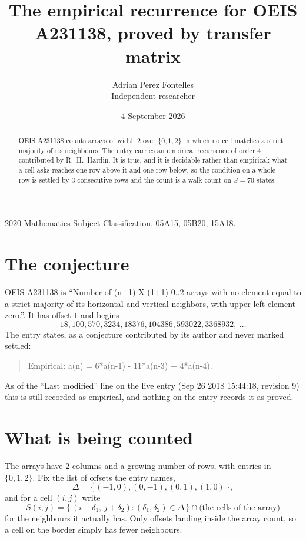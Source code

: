 \documentclass[11pt,a4paper]{article}
\title{The empirical recurrence for OEIS A231138, proved by transfer matrix}
\author{Adrian Perez Fontelles\\ \small Independent researcher}
\date{4 September 2026}
\theoremstyle{plain}
\theoremstyle{definition}
\begin{document}
\maketitle

\begin{abstract}
OEIS A231138 counts arrays of width $2$ over $\{0,1,2\}$ in which no cell matches a strict majority of its neighbours. The entry carries an
empirical recurrence of order $4$ contributed by R.~H.~Hardin. It is true, and it is
decidable rather than empirical: what a cell asks reaches one row above
it and one row below, so the condition on a whole row is settled by
$3$ consecutive rows and the count is a walk count on $S=70$ states.
\end{abstract}

\noindent\small 2020 Mathematics Subject Classification. 05A15, 05B20, 15A18.\normalsize

\section{The conjecture}

OEIS A231138 is ``Number of (n+1) X (1+1) 0..2 arrays with no element equal to a strict majority of its horizontal and vertical neighbors, with upper left element zero.''. It has offset $1$ and begins
\[
18, 100, 570, 3234, 18376, 104386, 593022, 3368932,\ \dots
\]
The entry states, as a conjecture contributed by its author and never marked settled:
\begin{quote}
Empirical: a(n) = 6*a(n-1) - 11*a(n-3) + 4*a(n-4).
\end{quote}
As of the ``Last modified'' line on the live entry (Sep 26 2018 15:44:18, revision 9) this is still
recorded as empirical, and nothing on the entry records it as proved.

\section{What is being counted}

The arrays have $2$ columns and a growing number of rows, with entries in $\{0,1,2\}$. Fix the
list of offsets the entry names,
\[
\Delta=\{\,(-1,0), (0,-1), (0,1), (1,0)\,\},
\]
and for a cell $(i,j)$ write
\[
S(i,j)=\{\,(i+\delta_1,\,j+\delta_2) : (\delta_1,\delta_2)\in\Delta\,\}\cap
\text{(the cells of the array)}
\]
for the neighbours it actually has. Only offsets landing inside the array count, so a cell on
the border simply has fewer neighbours.
\end{document}
